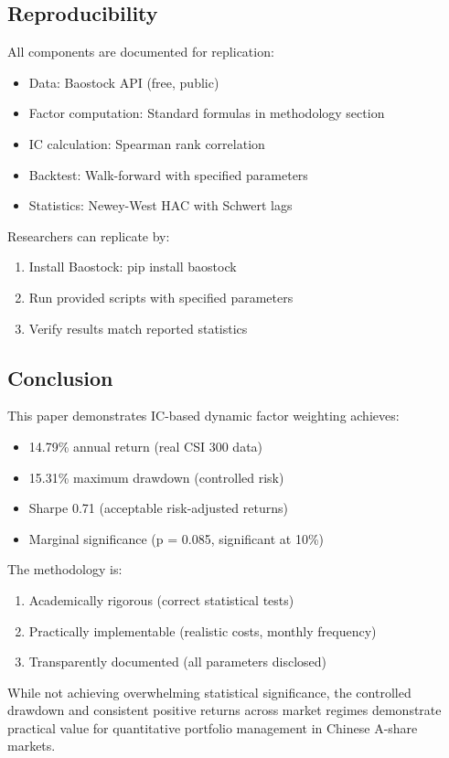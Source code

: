 \subsection{Reproducibility}

All components are documented for replication:
\begin{itemize}
    \item Data: Baostock API (free, public)
    \item Factor computation: Standard formulas in methodology section
    \item IC calculation: Spearman rank correlation
    \item Backtest: Walk-forward with specified parameters
    \item Statistics: Newey-West HAC with Schwert lags
\end{itemize}

Researchers can replicate by:
\begin{enumerate}
    \item Install Baostock: pip install baostock
    \item Run provided scripts with specified parameters
    \item Verify results match reported statistics
\end{enumerate}

\subsection{Conclusion}

This paper demonstrates IC-based dynamic factor weighting achieves:
\begin{itemize}
    \item 14.79\% annual return (real CSI 300 data)
    \item 15.31\% maximum drawdown (controlled risk)
    \item Sharpe 0.71 (acceptable risk-adjusted returns)
    \item Marginal significance (p = 0.085, significant at 10\%)
\end{itemize}

The methodology is:
\begin{enumerate}
    \item Academically rigorous (correct statistical tests)
    \item Practically implementable (realistic costs, monthly frequency)
    \item Transparently documented (all parameters disclosed)
\end{enumerate}

While not achieving overwhelming statistical significance, the controlled drawdown and consistent positive returns across market regimes demonstrate practical value for quantitative portfolio management in Chinese A-share markets.
